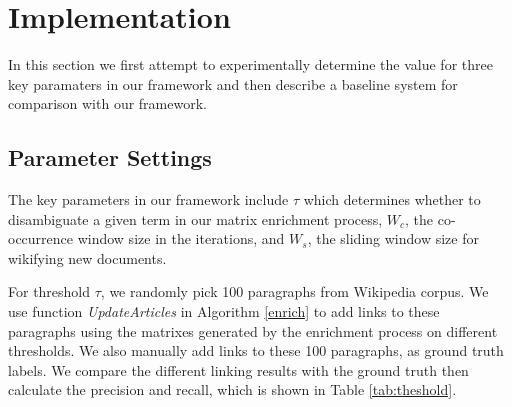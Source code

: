 \section{Implementation}
\label{sec:implement}

In this section we first attempt to experimentally 
determine the value for three key 
paramaters in our framework and then describe a baseline system for comparison
with our framework.

\subsection{Parameter Settings}
\label{sec:config}
The key parameters in our framework include $\tau$ which determines whether
to disambiguate a given term in our matrix enrichment process,
$W_c$, the co-occurrence window size in the iterations, and $W_s$, 
the sliding window size for wikifying new documents. 

For threshold $\tau$, we randomly pick 100 paragraphs from Wikipedia corpus. We use function \emph{UpdateArticles} in
Algorithm \ref{enrich} to add links to these paragraphs using the matrixes
generated by the enrichment process on different thresholds.
We also manually add links to these 100 paragraphs, as ground truth labels.
We compare the different linking results with the ground truth then calculate the
precision and recall, which is shown in Table \ref{tab:theshold}.

